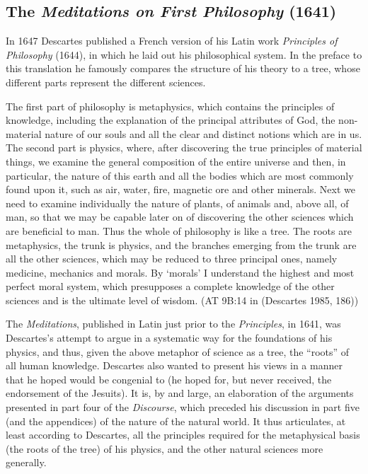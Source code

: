 \documentclass[12pt]{article}
\makeatletter
\newcommand{\citeprocitem}[2]{\hyper@linkstart{cite}{citeproc_bib_item_#1}#2\hyper@linkend}
\makeatother
\begin{document}
\subsection{The \emph{Meditations on First Philosophy} (1641)}
\label{sec:org38f2f6f}
In 1647 Descartes published a French version of his Latin work \emph{Principles of
Philosophy} (1644), in which he laid out his philosophical system. In the preface to
this translation he famously compares the structure of his theory to a tree, whose
different parts represent the different sciences.

\begin{quote-b}
The first part of philosophy is metaphysics, which contains the principles of
knowledge, including the explanation of the principal attributes of God, the
non-material nature of our souls and all the clear and distinct notions which are
in us. The second part is physics, where, after discovering the true principles of
material things, we examine the general composition of the entire universe and
then, in particular, the nature of this earth and all the bodies which are most
commonly found upon it, such as air, water, fire, magnetic ore and other minerals.
Next we need to examine individually the nature of plants, of animals and, above
all, of man, so that we may be capable later on of discovering the other sciences
which are beneficial to man. Thus the whole of philosophy is like a tree. The roots
are metaphysics, the trunk is physics, and the branches emerging from the trunk are
all the other sciences, which may be reduced to three principal ones, namely
medicine, mechanics and morals. By `morals' I understand the highest and most
perfect moral system, which presupposes a complete knowledge of the other sciences
and is the ultimate level of wisdom. (AT 9B:14 in (\citeprocitem{2}{Descartes 1985, 186}))
\end{quote-b}

The \emph{Meditations}, published in Latin just prior to the \emph{Principles}, in 1641, was
Descartes's attempt to argue in a systematic way for the foundations of his physics,
and thus, given the above metaphor of science as a tree, the ``roots'' of all human
knowledge. Descartes also wanted to present his views in a manner that he hoped would
be congenial to 
(he hoped for, but never received, the endorsement of the Jesuits). It is, by and
large, an elaboration of the arguments presented in part four of the \emph{Discourse},
which preceded his discussion in part five (and the appendices) of the nature of the
natural world. It thus articulates, at least according to Descartes, all the
principles required for the metaphysical basis (the roots of the tree) of his
physics, and the other natural sciences more generally.
\end{document}
